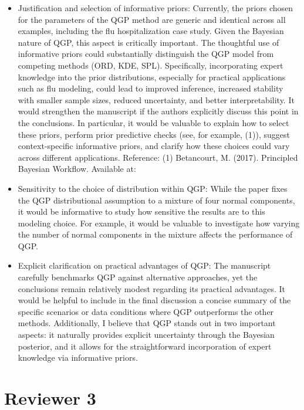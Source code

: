 \documentclass{article}
\begin{document}
\begin{itemize}
\item Justification and selection of informative priors:
 Currently, the priors chosen for the parameters of the QGP method are generic 
 and identical across all examples, including the flu hospitalization case 
 study. Given the Bayesian nature of QGP, this aspect is critically important. 
 The thoughtful use of informative priors could substantially distinguish the 
 QGP model from competing methods (ORD, KDE, SPL). Specifically, incorporating 
 expert knowledge into the prior distributions, especially for practical 
 applications such as flu modeling, could lead to improved inference, 
 increased stability with smaller sample sizes, reduced uncertainty, and 
 better interpretability. It would strengthen the manuscript if the authors 
 explicitly discuss this point in the conclusions. In particular, it would be 
 valuable to explain how to select these priors, perform prior predictive 
 checks (see, for example, (1)), suggest context-specific informative priors, 
 and clarify how these choices could vary across different applications.
Reference:
(1) Betancourt, M. (2017). Principled Bayesian Workflow. Available at:
\href{https://betanalpha.github.io/assets/case_studies/principled_bayesian_workflow.html}{}

\item Sensitivity to the choice of distribution within QGP:
 While the paper fixes the QGP distributional assumption to a mixture of four 
 normal components, it would be informative to study how sensitive the results 
 are to this modeling choice. For example, it would be valuable to investigate 
 how varying the number of normal components in the mixture affects the 
 performance of QGP.

\item Explicit clarification on practical advantages of QGP:
 The manuscript carefully benchmarks QGP against alternative approaches, yet 
 the conclusions remain relatively modest regarding its practical advantages. 
 It would be helpful to include in the final discussion a concise summary of 
 the specific scenarios or data conditions where QGP outperforms the other 
 methods. Additionally, I believe that QGP stands out in two important aspects: 
 it naturally provides explicit uncertainty through the Bayesian posterior, and 
 it allows for the straightforward incorporation of expert knowledge via 
 informative priors.
 
\end{itemize}
\section*{Reviewer 3}
\end{document}
